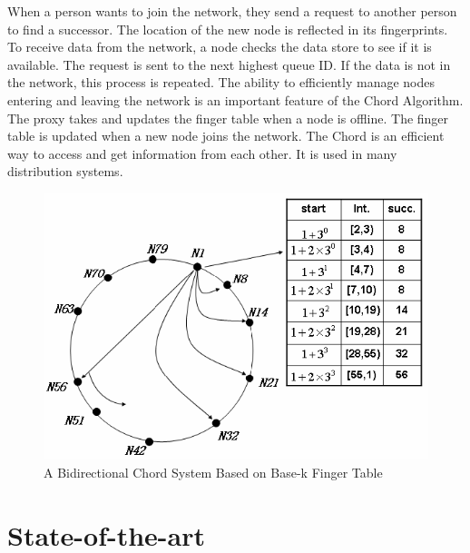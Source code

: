 \documentclass{article}
\begin{document}
When a person wants to join the network, they send a request to another person to find a successor. The location of the new node is reflected in its fingerprints. To receive data from the network, a node checks the data store to see if it is available. The request is sent to the next highest queue ID. If the data is not in the network, this process is repeated. The ability to efficiently manage nodes entering and leaving the network is an important feature of the Chord Algorithm. The proxy takes and updates the finger table when a node is offline. The finger table is updated when a new node joins the network. The Chord is an efficient way to access and get information from each other. It is used in many distribution systems.
\cite{reference_1}

\begin{figure}[h]
\centering
\includegraphics[width=\textwidth]{ChordAlgorithm.png}
\caption{A Bidirectional Chord System Based on Base-k Finger Table}
\label{figure 1}
\end{figure}


\pagebreak

\section{State-of-the-art}
\end{document}

